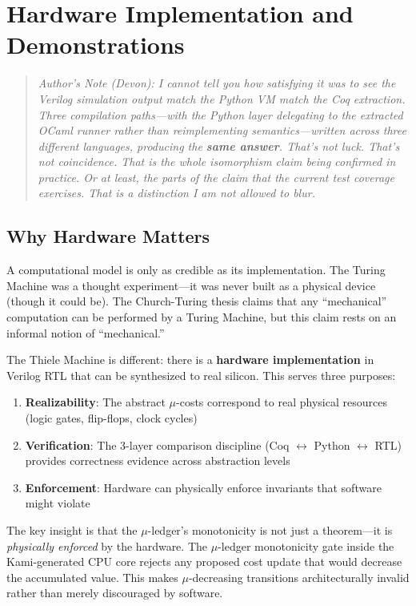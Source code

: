 \section{Hardware Implementation and Demonstrations}

\begin{quote}
\textit{Author's Note (Devon): I cannot tell you how satisfying it was to see the Verilog simulation output match the Python VM match the Coq extraction. Three compilation paths---with the Python layer delegating to the extracted OCaml runner rather than reimplementing semantics---written across three different languages, producing the \textbf{same answer}. That's not luck. That's not coincidence. That is the whole isomorphism claim being confirmed in practice. Or at least, the parts of the claim that the current test coverage exercises. That is a distinction I am not allowed to blur.}
\end{quote}

\subsection{Why Hardware Matters}

A computational model is only as credible as its implementation. The Turing Machine was a thought experiment---it was never built as a physical device (though it could be). The Church-Turing thesis claims that any ``mechanical'' computation can be performed by a Turing Machine, but this claim rests on an informal notion of ``mechanical.''

The Thiele Machine is different: there is a \textbf{hardware implementation} in Verilog RTL that can be synthesized to real silicon. This serves three purposes:
\begin{enumerate}
    \item \textbf{Realizability}: The abstract $\mu$-costs correspond to real physical resources (logic gates, flip-flops, clock cycles)
    \item \textbf{Verification}: The 3-layer comparison discipline (Coq $\leftrightarrow$ Python $\leftrightarrow$ RTL) provides correctness evidence across abstraction levels
    \item \textbf{Enforcement}: Hardware can physically enforce invariants that software might violate
\end{enumerate}

The key insight is that the $\mu$-ledger's monotonicity is not just a theorem---it is \textit{physically enforced} by the hardware. The $\mu$-ledger monotonicity gate inside the Kami-generated CPU core rejects any proposed cost update that would decrease the accumulated value. This makes $\mu$-decreasing transitions architecturally invalid rather than merely discouraged by software.

